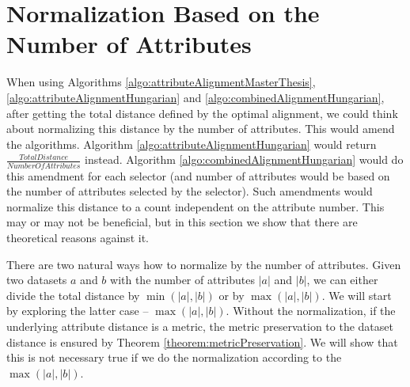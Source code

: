 \section{Normalization Based on the Number of Attributes}
When using Algorithms \ref{algo:attributeAlignmentMasterThesis}, \ref{algo:attributeAlignmentHungarian} and \ref{algo:combinedAlignmentHungarian}, after getting the total distance defined by the optimal alignment, we could think about normalizing this distance by the number of attributes. This would amend the algorithms. Algorithm \ref{algo:attributeAlignmentHungarian} would return $\frac{TotalDistance}{NumberOfAttributes}$ instead. Algorithm \ref{algo:combinedAlignmentHungarian} would do this amendment for each selector (and number of attributes would be based on the number of attributes selected by the selector). Such amendments would normalize this distance to a count independent on the attribute number. This may or may not be beneficial, but in this section we show that there are theoretical reasons against it.

There are two natural ways how to normalize by the number of attributes. Given two datasets $a$ and $b$ with the number of attributes $|a|$ and $|b|$, we can either divide the total distance by $\min(|a|,|b|)$ or by $\max(|a|,|b|)$.
We will start by exploring the latter case -- $\max(|a|,|b|)$. Without the normalization, if the underlying attribute distance is a metric, the metric preservation to the dataset distance is ensured by Theorem \ref{theorem:metricPreservation}. We will show that this is not necessary true if we do the normalization according to the $\max(|a|,|b|)$.

